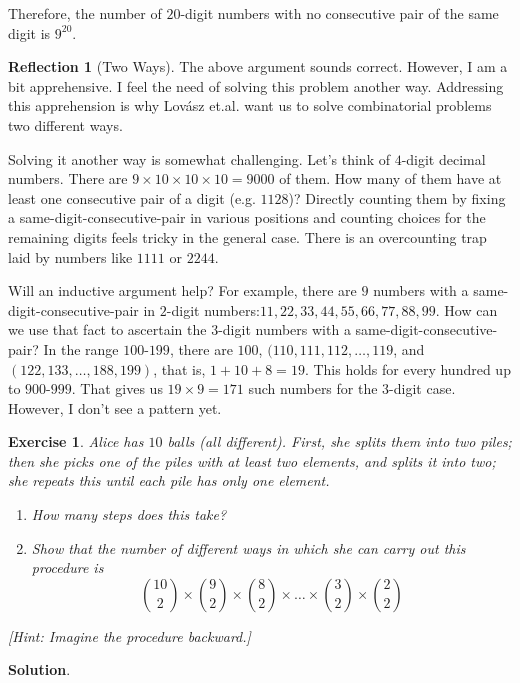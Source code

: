 \documentclass[11pt]{book}
\theoremstyle{definition}
\theoremstyle{plain}
\newtheorem{exercise}{Exercise}
\theoremstyle{definition}
\theoremstyle{problemstyle}
\theoremstyle{remark}
\theoremstyle{definition}
\newtheorem{reflection}{Reflection}
\begin{document}
Therefore, the number of $20$-digit numbers with no consecutive pair of the same digit is $9^{20}$.
\begin{reflection}[Two Ways]
    The above argument sounds correct. However, I am a bit apprehensive. I feel the need of solving this problem another way. Addressing this apprehension is why Lov\'asz et.al. want us to solve combinatorial problems two different ways.

    Solving it another way is somewhat challenging. Let's think of $4$-digit decimal numbers. There are $9\times10\times10\times10=9000$ of them. How many of them have at least one consecutive pair of a digit (e.g. $1128$)? Directly counting them by fixing a same-digit-consecutive-pair in various positions and counting choices for the remaining digits feels tricky in the general case. There is an overcounting trap laid by numbers like $1111$ or $2244$.

    Will an inductive argument help? For example, there are $9$ numbers with a same-digit-consecutive-pair in $2$-digit numbers:$11,22,33,44,55,66,77,88,99$. How can we use that fact to ascertain the $3$-digit numbers with a same-digit-consecutive-pair? In the range $100$-$199$, there are $100$, $(110,111,112,\dots,119$, and $(122,133,\dots,188,199)$, that is, $1+10+8=19$. This holds for every hundred up to $900$-$999$. That gives us $19\times9=171$ such numbers for the $3$-digit case. However, I don't see a pattern yet.
\end{reflection}
\begin{exercise}
    \label{ex:1.8.27}
    Alice has $10$ balls (all different). First, she splits them into two piles; then she picks one of the piles with at least two elements, and splits it into two; she repeats this until each pile has only one element.
    \begin{enumerate}[label=(\alph*)]
        \item How many steps does this take?
        \item Show that the number of different ways in which she can carry out this procedure is
            \[
                \binom{10}{2}\times\binom{9}{2}\times\binom{8}{2}\times\dots\times\binom{3}{2}\times\binom{2}{2}
            \]
    \end{enumerate}
            [Hint: Imagine the procedure backward.]
\end{exercise}
\textbf{Solution}.
\end{document}
